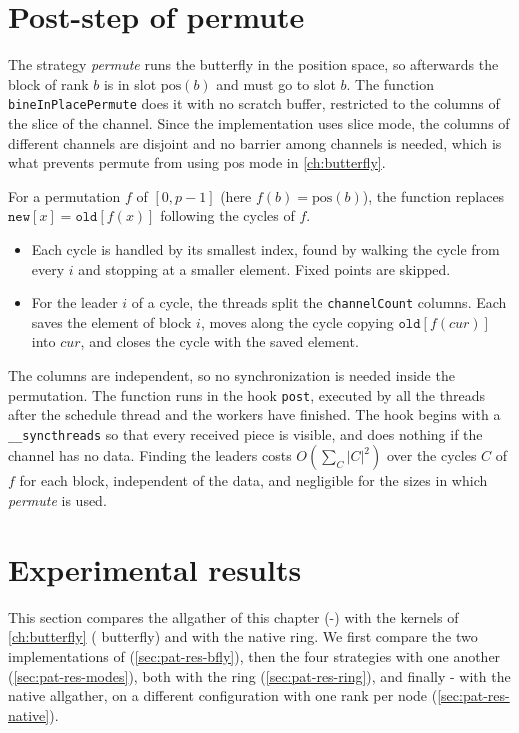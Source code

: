 \section{Post-step of permute}\label{sec:pat-permute}

The strategy \emph{permute} runs the butterfly in the position space, so afterwards the block of rank $b$ is in slot $\mathrm{pos}(b)$ and must go to slot $b$.
The function \texttt{bineInPlacePermute} does it with no scratch buffer, restricted to the columns of the slice of the channel.
Since the implementation uses slice mode, the columns of different channels are disjoint and no barrier among channels is needed, which is what prevents permute from using pos mode in \cref{ch:butterfly}.

For a permutation $f$ of $[0,p-1]$ (here $f(b)=\mathrm{pos}(b)$), the function replaces $\texttt{new}[x]=\texttt{old}[f(x)]$ following the cycles of $f$.
\begin{itemize}
  \item Each cycle is handled by its smallest index, found by walking the cycle from every $i$ and stopping at a smaller element. Fixed points are skipped.
  \item For the leader $i$ of a cycle, the threads split the \texttt{channelCount} columns. Each saves the element of block $i$, moves along the cycle copying $\texttt{old}[f(\mathit{cur})]$ into $\mathit{cur}$, and closes the cycle with the saved element.
\end{itemize}
The columns are independent, so no synchronization is needed inside the permutation.
The function runs in the hook \texttt{post}, executed by all the threads after the schedule thread and the workers have finished. The hook begins with a \texttt{\_\_syncthreads} so that every received piece is visible, and does nothing if the channel has no data.
Finding the leaders costs $O(\sum_C \lvert C\rvert^2)$ over the cycles $C$ of $f$ for each block, independent of the data, and negligible for the sizes in which \emph{permute} is used.

\section{Experimental results}\label{sec:pat-exp}

This section compares the allgather of this chapter (\bine{}-\pat{}) with the kernels of \cref{ch:butterfly} (\bine{} butterfly) and with the native \nccl{} ring.
We first compare the two implementations of \bine{} (\cref{sec:pat-res-bfly}), then the four strategies with one another (\cref{sec:pat-res-modes}), both with the ring (\cref{sec:pat-res-ring}), and finally \bine{}-\pat{} with the native \pat{} allgather, on a different configuration with one rank per node (\cref{sec:pat-res-native}).

